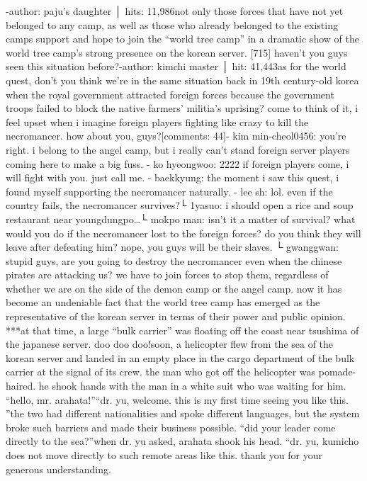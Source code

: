 -author: paju’s daughter │ hits: 11,986not only those forces that have not yet belonged to any camp, as well as those who already belonged to the existing camps support and hope to join the “world tree camp” in a dramatic show of the world tree camp’s strong presence on the korean server.
[715] haven’t you guys seen this situation before?-author: kimchi master │ hit: 41,443as for the world quest, don’t you think we’re in the same situation back in 19th century-old korea when the royal government attracted foreign forces because the government troops failed to block the native farmers’ militia’s uprising? come to think of it, i feel upset when i imagine foreign players fighting like crazy to kill the necromancer.
 how about you, guys?[comments: 44]- kim min-cheol0456: you’re right.
 i belong to the angel camp, but i really can’t stand foreign server players coming here to make a big fuss.
- ko hyeongwoo: 2222 if foreign players come, i will fight with you.
 just call me.
- baekkyung: the moment i saw this quest, i found myself supporting the necromancer naturally.
- lee sh: lol.
 even if the country fails, the necromancer survives?└ 1yasuo: i should open a rice and soup restaurant near youngdungpo…└ mokpo man: isn’t it a matter of survival? what would you do if the necromancer lost to the foreign forces? do you think they will leave after defeating him? nope, you guys will be their slaves.
└ gwanggwan: stupid guys, are you going to destroy the necromancer even when the chinese pirates are attacking us? we have to join forces to stop them, regardless of whether we are on the side of the demon camp or the angel camp.
now it has become an undeniable fact that the world tree camp has emerged as the representative of the korean server in terms of their power and public opinion.
***at that time, a large “bulk carrier” was floating off the coast near tsushima of the japanese server.
doo doo doo!soon, a helicopter flew from the sea of the korean server and landed in an empty place in the cargo department of the bulk carrier at the signal of its crew.
the man who got off the helicopter was pomade-haired.
 he shook hands with the man in a white suit who was waiting for him.
“hello, mr.
 arahata!”“dr.
 yu, welcome.
 this is my first time seeing you like this.
”the two had different nationalities and spoke different languages, but the system broke such barriers and made their business possible.
“did your leader come directly to the sea?”when dr.
 yu asked, arahata shook his head.
“dr.
 yu, kumicho does not move directly to such remote areas like this.
 thank you for your generous understanding.
